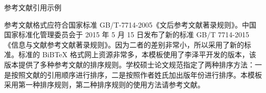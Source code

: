 



参考文献引用示例


参考文献格式应符合国家标准 GB/T-7714-2005《文后参考文献著录规则》。中国国家标准化管理委员会于 2015 年 5 月 15 日发布了新的标准 GB/T 7714-2015《信息与文献参考文献著录规则》。因为二者的差别非常小，所以采用了新的标准。标准的 BiBTeX 格式网上资源非常多，本模板使用了李泽平开发的版本，该版本提供了多种参考文献的排序规则。学校硕士论文规范指定了两种排序方法：一是按照文献的引用顺序进行排序，二是按照作者姓氏加出版年份进行排序。本模板采用第一种排序规则，第二种排序规则的使用方法请参考文献\textsuperscript{\cite{1}}。



\clearpage


